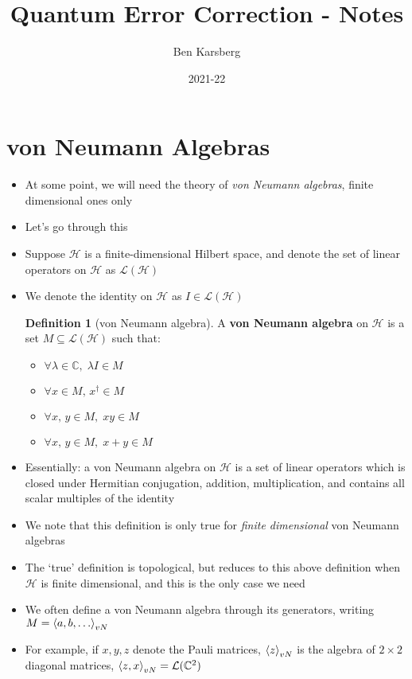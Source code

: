 \documentclass[12pt,a4paper]{article}
\title{Quantum Error Correction - Notes}
\author{Ben Karsberg}
\date{2021-22}
\numberwithin{equation}{section}
\theoremstyle{definition}
\newtheorem{definition}{Definition}[section]
\theoremstyle{theorem}
\begin{document}
	\maketitle
	\section{von Neumann Algebras}
	\newcommand{\lops}{\mathcal{L}(\mathcal{H})}
	\begin{itemize}
		\item At some point, we will need the theory of \textit{von Neumann algebras}, finite dimensional ones only
		\item Let's go through this
		\item Suppose $\mathcal{H}$ is a finite-dimensional Hilbert space, and denote the set of linear operators on $\mathcal{H}$ as $\lops$
		\item We denote the identity on $\mathcal{H}$ as $I\in\lops$
		\begin{definition}[von Neumann algebra]
			A \textbf{von Neumann algebra} on $\mathcal{H}$ is a set $M\subseteq\lops$ such that:
			\begin{itemize}
				\item $\forall \lambda\in\mathbb{C},\;\lambda I\in M$
				\item $\forall x\in M,\,x^{\dagger}\in M$
				\item $\forall x,\,y\in M,\; xy\in M$
				\item $\forall x,\,y\in M,\; x+y\in M$
			\end{itemize}
		\end{definition}
		\item Essentially: a von Neumann algebra on $\mathcal{H}$ is a set of linear operators which is closed under Hermitian conjugation, addition, multiplication, and contains all scalar multiples of the identity
		\item We note that this definition is only true for \textit{finite dimensional} von Neumann algebras
		\item The `true' definition is topological, but reduces to this above definition when $\mathcal{H}$ is finite dimensional, and this is the only case we need
		\item We often define a von Neumann algebra through its generators, writing $M=\braket{a,b,\ldots}_{vN}$
		\item For example, if $x,y,z$ denote the Pauli matrices, $\braket{z}_{vN}$ is the algebra of $2\times 2$ diagonal matrices, $\braket{z,x}_{vN}=\mathcal{L}(\mathbb{C}^{2})$

\end{itemize}
\end{document}
